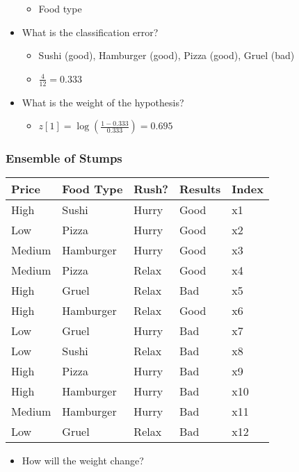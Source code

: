 \documentclass[compress, 9pt]{beamer}
\begin{document}
\begin{frame}
\begin{itemize}
\begin{itemize}
\item <5-> Food type
\label{sec-3-1-2-1}%
\end{itemize} %

\item <6-> What is the classification error?
\label{sec-3-1-3}%
\begin{itemize}

\item <7-> Sushi (good), Hamburger (good), Pizza (good), Gruel (bad)
\label{sec-3-1-3-1}%

\item <7-> $\frac{4}{12}=0.333$
\label{sec-3-1-3-2}%
\end{itemize} %

\item <8-> What is the weight of the hypothesis?
\label{sec-3-1-4}%
\begin{itemize}

\item <9-> $z[1 ]= \log(\frac{1-0.333}{0.333}) = 0.695$
\label{sec-3-1-4-1}%
\end{itemize} %
\end{itemize} %
\end{frame}
\begin{frame}
\frametitle{Ensemble of Stumps}
\label{sec-3-2}

\small

\begin{center}
\begin{tabular}{lllll}
\hline
 Price   &  Food Type  &  Rush?  &  Results  &  Index  \\
\hline
 High    &  Sushi      &  Hurry  &  Good     &  x1     \\
 Low     &  Pizza      &  Hurry  &  Good     &  x2     \\
 Medium  &  Hamburger  &  Hurry  &  Good     &  x3     \\
 Medium  &  Pizza      &  Relax  &  Good     &  x4     \\
 High    &  Gruel      &  Relax  &  Bad      &  x5     \\
 High    &  Hamburger  &  Relax  &  Good     &  x6     \\
 Low     &  Gruel      &  Hurry  &  Bad      &  x7     \\
 Low     &  Sushi      &  Relax  &  Bad      &  x8     \\
 High    &  Pizza      &  Hurry  &  Bad      &  x9     \\
 High    &  Hamburger  &  Hurry  &  Bad      &  x10    \\
 Medium  &  Hamburger  &  Hurry  &  Bad      &  x11    \\
 Low     &  Gruel      &  Relax  &  Bad      &  x12    \\
\hline
\end{tabular}
\end{center}
\begin{itemize}

\item How will the weight change?
\label{sec-3-2-1}%
\end{itemize} %
\end{frame}
\end{document}

